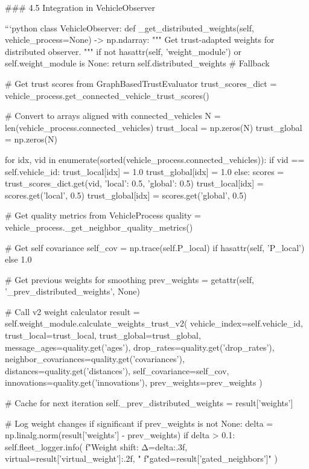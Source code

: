 ### 4.5 Integration in VehicleObserver

```python
class VehicleObserver:
    def _get_distributed_weights(self, vehicle_process=None) -> np.ndarray:
        """
        Get trust-adapted weights for distributed observer.
        """
        if not hasattr(self, 'weight_module') or self.weight_module is None:
            return self.distributed_weights  # Fallback
        
        # Get trust scores from GraphBasedTrustEvaluator
        trust_scores_dict = vehicle_process.get_connected_vehicle_trust_scores()
        
        # Convert to arrays aligned with connected_vehicles
        N = len(vehicle_process.connected_vehicles)
        trust_local = np.zeros(N)
        trust_global = np.zeros(N)
        
        for idx, vid in enumerate(sorted(vehicle_process.connected_vehicles)):
            if vid == self.vehicle_id:
                trust_local[idx] = 1.0
                trust_global[idx] = 1.0
            else:
                scores = trust_scores_dict.get(vid, {'local': 0.5, 'global': 0.5})
                trust_local[idx] = scores.get('local', 0.5)
                trust_global[idx] = scores.get('global', 0.5)
        
        # Get quality metrics from VehicleProcess
        quality = vehicle_process._get_neighbor_quality_metrics()
        
        # Get self covariance
        self_cov = np.trace(self.P_local) if hasattr(self, 'P_local') else 1.0
        
        # Get previous weights for smoothing
        prev_weights = getattr(self, '_prev_distributed_weights', None)
        
        # Call v2 weight calculator
        result = self.weight_module.calculate_weights_trust_v2(
            vehicle_index=self.vehicle_id,
            trust_local=trust_local,
            trust_global=trust_global,
            message_ages=quality.get('ages'),
            drop_rates=quality.get('drop_rates'),
            neighbor_covariances=quality.get('covariances'),
            distances=quality.get('distances'),
            self_covariance=self_cov,
            innovations=quality.get('innovations'),
            prev_weights=prev_weights
        )
        
        # Cache for next iteration
        self._prev_distributed_weights = result['weights']
        
        # Log weight changes if significant
        if prev_weights is not None:
            delta = np.linalg.norm(result['weights'] - prev_weights)
            if delta > 0.1:
                self.fleet_logger.info(
                    f"Weight shift: Δ={delta:.3f}, virtual={result['virtual_weight']:.2f}, "
                    f"gated={result['gated_neighbors']}"
                )
        
